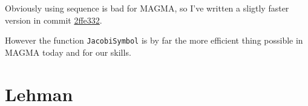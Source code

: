 \documentclass{article}
\theoremstyle{plain}
\theoremstyle{remark}
\theoremstyle{definition}
\begin{document}
Obviously using sequence is bad for MAGMA, so I've written a sligtly faster version in commit \href{https://github.com/giacomoborin/project2_MAGMA/commit/2ffe332f8ee782b20a079694f1c1cf9363aae3d0}{2ffe332}.


However the function \verb|JacobiSymbol| is by far the more efficient thing possible in MAGMA today and for our skills. 


\section{Lehman}

\appendix


\newpage
\printbibliography
\end{document}
